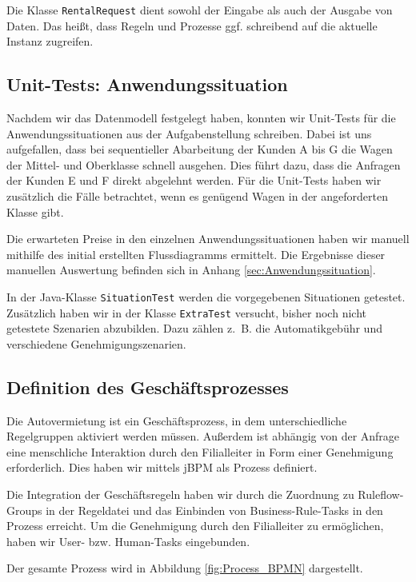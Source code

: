 Die Klasse \texttt{RentalRequest} dient sowohl der Eingabe als auch der Ausgabe von Daten.
Das heißt, dass Regeln und Prozesse ggf. schreibend auf die aktuelle Instanz zugreifen.

\subsection{Unit-Tests: Anwendungssituation}

Nachdem wir das Datenmodell festgelegt haben, konnten wir Unit-Tests für die 
Anwendungssituationen aus der Aufgabenstellung schreiben. Dabei ist uns aufgefallen,
dass bei sequentieller Abarbeitung der Kunden A bis G die Wagen der Mittel- und
Oberklasse schnell ausgehen. Dies führt dazu, dass die Anfragen der Kunden E und F
direkt abgelehnt werden. Für die Unit-Tests haben wir zusätzlich die Fälle betrachtet,
wenn es genügend Wagen in der angeforderten Klasse gibt.

Die erwarteten Preise in den einzelnen Anwendungssituationen haben wir manuell
mithilfe des initial erstellten Flussdiagramms ermittelt. Die Ergebnisse dieser
manuellen Auswertung befinden sich in Anhang \ref{sec:Anwendungssituation}.

In der Java-Klasse \texttt{SituationTest} werden die vorgegebenen Situationen getestet.
Zusätzlich haben wir in der Klasse \texttt{ExtraTest} versucht, bisher noch nicht
getestete Szenarien abzubilden. Dazu zählen z.~B. die Automatikgebühr und verschiedene
Genehmigungszenarien.

\subsection{Definition des Geschäftsprozesses}

Die Autovermietung ist ein Geschäftsprozess, in dem unterschiedliche Regelgruppen aktiviert
werden müssen. Außerdem ist abhängig von der Anfrage eine menschliche Interaktion durch den
Filialleiter in Form einer Genehmigung erforderlich. Dies haben wir mittels
jBPM als Prozess definiert.

Die Integration der Geschäftsregeln haben wir durch die Zuordnung zu Ruleflow-Groups
in der Regeldatei und das Einbinden von Business-Rule-Tasks in den Prozess erreicht.
Um die Genehmigung durch den Filialleiter zu ermöglichen, haben wir User- bzw.
Human-Tasks eingebunden.

Der gesamte Prozess wird in Abbildung \ref{fig:Process_BPMN} dargestellt.

